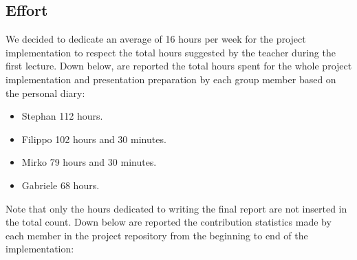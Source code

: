 \subsection{Effort}
We decided to dedicate an average of 16 hours per week for the project implementation to respect the total hours suggested by the teacher during the first lecture.\newline
Down below, are reported the total hours spent for the whole project implementation and presentation preparation by each group member based on the personal diary:
\begin{itemize}
  \item Stephan 112 hours.
  \item Filippo 102 hours and 30 minutes.
  \item Mirko 79 hours and 30 minutes.
  \item Gabriele 68 hours.
\end{itemize}
Note that only the hours dedicated to writing the final report are not inserted in the total count.\newline
Down below are reported the contribution statistics made by each member in the project repository from the beginning to end of the implementation:
